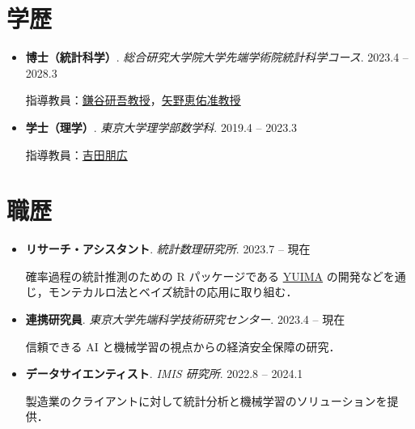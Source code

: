 \documentclass[
  11pt,
]{article}
\renewcommand{\labelitemi}{\textcolor{minty}{\faCheckCircle}} %
\begin{document}
\section{学歴}\label{ux5b66ux6b74}

\renewcommand{\labelitemi}{\textcolor{minty}{\faGraduationCap}}

\begin{itemize}
\item
  \textbf{博士（統計科学）}.
  \emph{総合研究大学院大学先端学術院統計科学コース}. \hfill {2023.4 --
  2028.3}

  指導教員：\href{https://sites.google.com/view/kengokamatani/home}{鎌谷研吾教授}，\href{https://sites.google.com/site/kyanostat/}{矢野恵佑准教授}
\item
  \textbf{学士（理学）}. \emph{東京大学理学部数学科}. \hfill {2019.4 --
  2023.3}

  指導教員：\href{https://www.ms.u-tokyo.ac.jp/~nakahiro/hp-naka-e}{吉田朋広}
\end{itemize}

\section{職歴}\label{ux8077ux6b74}

\renewcommand{\labelitemi}{\textcolor{minty}{\faUniversity}}

\begin{itemize}
\item
  \textbf{リサーチ・アシスタント}. \emph{統計数理研究所}. \hfill {2023.7
  -- 現在}

  確率過程の統計推測のための R パッケージである
  \href{https://r-forge.r-project.org/projects/yuima/}{YUIMA}
  の開発などを通じ，モンテカルロ法とベイズ統計の応用に取り組む．
\item
  \textbf{連携研究員}. \emph{東京大学先端科学技術研究センター}.
  \hfill {2023.4 -- 現在}

  信頼できる AI と機械学習の視点からの経済安全保障の研究．
\item
  \textbf{データサイエンティスト}. \emph{IMIS 研究所}. \hfill {2022.8 --
  2024.1}

  製造業のクライアントに対して統計分析と機械学習のソリューションを提供．
\end{itemize}

\renewcommand{\labelitemi}{\textcolor{minty}{\faBookmark}}
\end{document}
